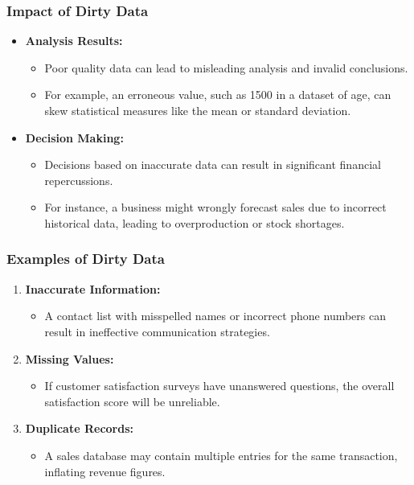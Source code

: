 \documentclass{beamer}
\begin{document}
\begin{frame}[fragile]
    \frametitle{Impact of Dirty Data}
    \begin{itemize}
        \item \textbf{Analysis Results:}
        \begin{itemize}
            \item Poor quality data can lead to misleading analysis and invalid conclusions.
            \item For example, an erroneous value, such as 1500 in a dataset of age, can skew statistical measures like the mean or standard deviation.
        \end{itemize}

        \item \textbf{Decision Making:}
        \begin{itemize}
            \item Decisions based on inaccurate data can result in significant financial repercussions.
            \item For instance, a business might wrongly forecast sales due to incorrect historical data, leading to overproduction or stock shortages.
        \end{itemize}
    \end{itemize}
\end{frame}

\begin{frame}[fragile]
    \frametitle{Examples of Dirty Data}
    \begin{enumerate}
        \item \textbf{Inaccurate Information:}
        \begin{itemize}
            \item A contact list with misspelled names or incorrect phone numbers can result in ineffective communication strategies.
        \end{itemize}

        \item \textbf{Missing Values:}
        \begin{itemize}
            \item If customer satisfaction surveys have unanswered questions, the overall satisfaction score will be unreliable.
        \end{itemize}

        \item \textbf{Duplicate Records:}
        \begin{itemize}
            \item A sales database may contain multiple entries for the same transaction, inflating revenue figures.
        \end{itemize}
    \end{enumerate}
\end{frame}
\end{document}
